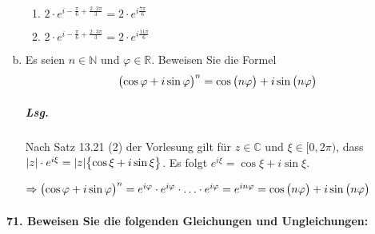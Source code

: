 \documentclass{scrreprt}
\begin{document}
\begin{enumerate}[(a)]
\begin{enumerate}[label={$w_{\arabic*} =$}]
  \item $2 \cdot e^{i -\frac{\pi}{6} + \frac{2 \cdot 2 \pi}{3}}
    = 2 \cdot e^{i \frac{7\pi}{6}}$

  \item $2 \cdot e^{i -\frac{\pi}{6} + \frac{2 \cdot 3 \pi}{3}}
    = 2 \cdot e^{i \frac{11\pi}{6}}$
  \end{enumerate}

\item Es seien $n \in \mathbb{N}$ und $\varphi \in \mathbb{R}$.
  Beweisen Sie die Formel
  \[
    \qty\big(\cos \varphi + i \sin \varphi)^n =
    \cos\qty\big(n\varphi) + i \sin\qty\big(n\varphi)
  \]

  \subparagraph{Lsg.} Nach Satz 13.21 (2) der Vorlesung gilt für
  $z \in \mathbb{C}$ und $\xi \in \big[0, 2\pi \big)$, dass
  $\abs{z} \cdot e^{i\xi} = \abs{z}\qty\big{\cos\xi + i\sin\xi}$.
  Es folgt $e^{i\xi} = \cos\xi + i\sin\xi$.

  $\Rightarrow \qty\big(\cos \varphi + i \sin \varphi)^n =
  e^{i\varphi} \cdot e^{i\varphi} \cdot \ldots \cdot e^{i\varphi}
  = e^{in\varphi} = \cos\qty\big(n\varphi) + i\sin\qty\big(n\varphi)$
\end{enumerate}

\newpage
\paragraph{71. Beweisen Sie die folgenden Gleichungen und Ungleichungen:}
\end{document}

